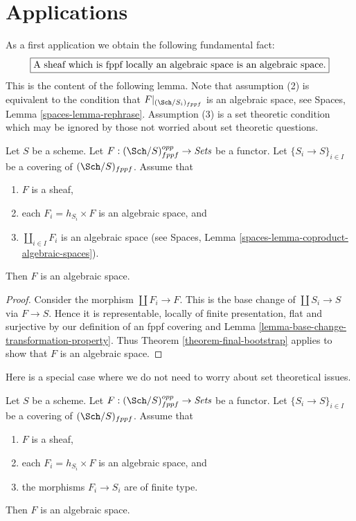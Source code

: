 \section{Applications}
\label{section-applications}

\noindent
As a first application we obtain the following fundamental fact:
$$
\fbox{A sheaf which is fppf locally an algebraic space is an algebraic space.}
$$
This is the content of the following lemma.
Note that assumption (2) is equivalent to the condition that
$F|_{(\Sch/S_i)_{fppf}}$ is an algebraic space, see
Spaces, Lemma \ref{spaces-lemma-rephrase}.
Assumption (3) is a set theoretic condition which may be ignored
by those not worried about set theoretic questions.

\begin{lemma}
\label{lemma-locally-algebraic-space}
Let $S$ be a scheme.
Let $F : (\Sch/S)_{fppf}^{opp} \to \textit{Sets}$ be a functor.
Let $\{S_i \to S\}_{i \in I}$ be a covering of $(\Sch/S)_{fppf}$.
Assume that
\begin{enumerate}
\item $F$ is a sheaf,
\item each $F_i = h_{S_i} \times F$ is an algebraic space, and
\item $\coprod_{i \in I} F_i$ is an algebraic space (see
Spaces, Lemma \ref{spaces-lemma-coproduct-algebraic-spaces}).
\end{enumerate}
Then $F$ is an algebraic space.
\end{lemma}

\begin{proof}
Consider the morphism $\coprod F_i \to F$. This is the base change
of $\coprod S_i \to S$ via $F \to S$. Hence it is representable,
locally of finite presentation, flat and surjective by our definition
of an fppf covering and
Lemma \ref{lemma-base-change-transformation-property}.
Thus
Theorem \ref{theorem-final-bootstrap}
applies to show that $F$ is an algebraic space.
\end{proof}

\noindent
Here is a special case where we do not need to worry about set theoretical
issues.

\begin{lemma}
\label{lemma-locally-algebraic-space-finite-type}
Let $S$ be a scheme.
Let $F : (\Sch/S)_{fppf}^{opp} \to \textit{Sets}$ be a functor.
Let $\{S_i \to S\}_{i \in I}$ be a covering of $(\Sch/S)_{fppf}$.
Assume that
\begin{enumerate}
\item $F$ is a sheaf,
\item each $F_i = h_{S_i} \times F$ is an algebraic space, and
\item the morphisms $F_i \to S_i$ are of finite type.
\end{enumerate}
Then $F$ is an algebraic space.
\end{lemma}

